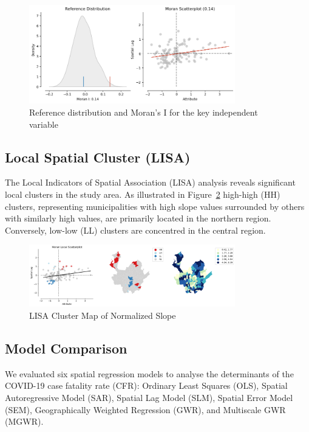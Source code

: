 \documentclass[a4paper,fleqn]{cas-sc}
\begin{document}
\begin{figure}[H]
  \centering
  \includegraphics[width=0.8\textwidth]{figures/figure04.png}
  \caption{Reference distribution and Moran's I for the key independent variable}\label{fig:moran}
  \end{figure}

\subsection{Local Spatial Cluster (LISA)}

The Local Indicators of Spatial Association (LISA) analysis reveals significant local clusters in the study area. As illustrated in Figure~\ref{fig:LISA} high-high (HH) clusters, representing municipalities with high slope values surrounded by others with similarly high values, are primarily located in the northern region.  Conversely, low-low (LL) clusters are concentred in the central region.

\begin{figure}[H]
  \centering
  \includegraphics[width=0.8\textwidth]{figures/figure05b.png}
  \caption{LISA Cluster Map of Normalized Slope}\label{fig:LISA}
  \end{figure}

\subsection{Model Comparison}

We evaluated six spatial regression models to analyse the determinants of the COVID-19 case fatality rate (CFR): Ordinary Least Squares (OLS), Spatial Autoregressive Model (SAR), Spatial Lag Model (SLM), Spatial Error Model (SEM), Geographically Weighted Regression (GWR), and Multiscale GWR (MGWR).
\end{document}
